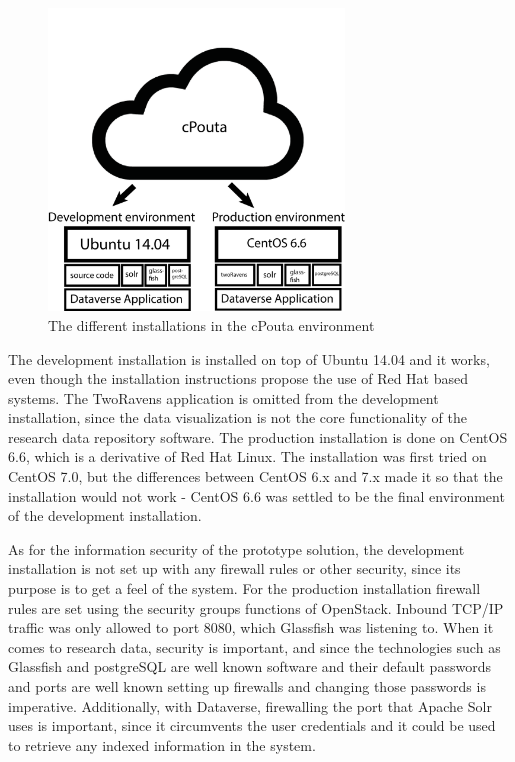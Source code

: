 \begin{figure}[t]
    \centering
    \includegraphics[width=0.7\textwidth]{images/cpouta2}
    \caption{The different installations in the cPouta environment}
    \label{fig:cpouta}
\end{figure}

The development installation is installed on top of Ubuntu 14.04 and it
works, even though the installation instructions propose the use of Red Hat
based systems. The TwoRavens application is omitted from the development
installation, since the data visualization is not the core functionality of
the research data repository software. The production installation is done
on CentOS 6.6, which is a derivative of Red Hat Linux. The installation was
first tried on CentOS 7.0, but the differences between CentOS 6.x and 7.x made
it so that the installation would not work - CentOS 6.6 was settled to be the
final environment of the development installation.

As for the information security of the prototype solution, the development
installation is not set up with any firewall rules or other security, since
its purpose is to get a feel of the system. For the production installation
firewall rules are set using the security groups functions of OpenStack.
Inbound TCP/IP traffic was only allowed to port 8080, which Glassfish was
listening to.
When it comes to research data, security is important, and since the
technologies such as Glassfish and postgreSQL are well known software and
their default passwords and ports are well known setting up firewalls and
changing those passwords is imperative. Additionally, with Dataverse,
firewalling the port that Apache Solr uses is important, since it circumvents
the user credentials and it could be used to retrieve any indexed information
in the system.

